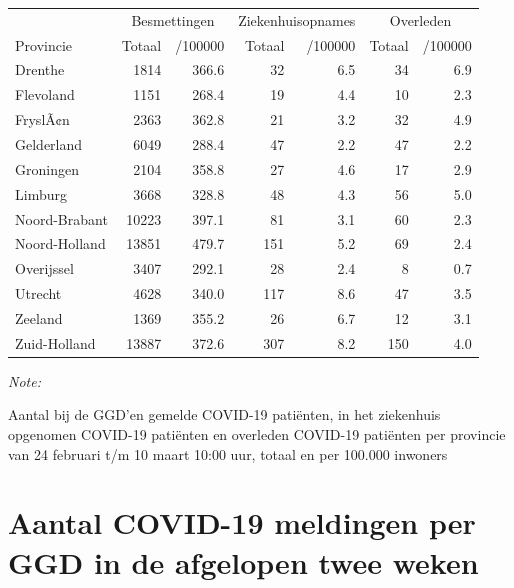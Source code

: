 \documentclass[
  english,
  man,floatsintext]{apa6}
\begin{document}
\begin{table}
\centering
\begin{threeparttable}
\begin{tabular}{lrrrrrr}
\toprule
\multicolumn{1}{c}{ } & \multicolumn{2}{c}{Besmettingen} & \multicolumn{2}{c}{Ziekenhuisopnames} & \multicolumn{2}{c}{Overleden} \\
\cmidrule(l{3pt}r{3pt}){2-3} \cmidrule(l{3pt}r{3pt}){4-5} \cmidrule(l{3pt}r{3pt}){6-7}
Provincie & Totaal & /100000 & Totaal & /100000 & Totaal & /100000\\
\midrule
Drenthe & 1814 & 366.6 & 32 & 6.5 & 34 & 6.9\\
Flevoland & 1151 & 268.4 & 19 & 4.4 & 10 & 2.3\\
FryslÃ¢n & 2363 & 362.8 & 21 & 3.2 & 32 & 4.9\\
Gelderland & 6049 & 288.4 & 47 & 2.2 & 47 & 2.2\\
Groningen & 2104 & 358.8 & 27 & 4.6 & 17 & 2.9\\
Limburg & 3668 & 328.8 & 48 & 4.3 & 56 & 5.0\\
Noord-Brabant & 10223 & 397.1 & 81 & 3.1 & 60 & 2.3\\
Noord-Holland & 13851 & 479.7 & 151 & 5.2 & 69 & 2.4\\
Overijssel & 3407 & 292.1 & 28 & 2.4 & 8 & 0.7\\
Utrecht & 4628 & 340.0 & 117 & 8.6 & 47 & 3.5\\
Zeeland & 1369 & 355.2 & 26 & 6.7 & 12 & 3.1\\
Zuid-Holland & 13887 & 372.6 & 307 & 8.2 & 150 & 4.0\\
\bottomrule
\end{tabular}
\begin{tablenotes}
\item \textit{Note: } 
\item Aantal bij de GGD’en gemelde COVID-19 patiënten, in het ziekenhuis opgenomen COVID-19 patiënten en overleden COVID-19 patiënten per provincie van 24 februari t/m 10 maart 10:00 uur, totaal en per 100.000 inwoners
\end{tablenotes}
\end{threeparttable}
\end{table}

\newpage

\hypertarget{aantal-covid-19-meldingen-per-ggd-in-de-afgelopen-twee-weken}{%
\section{Aantal COVID-19 meldingen per GGD in de afgelopen twee weken}\label{aantal-covid-19-meldingen-per-ggd-in-de-afgelopen-twee-weken}}
\end{document}
